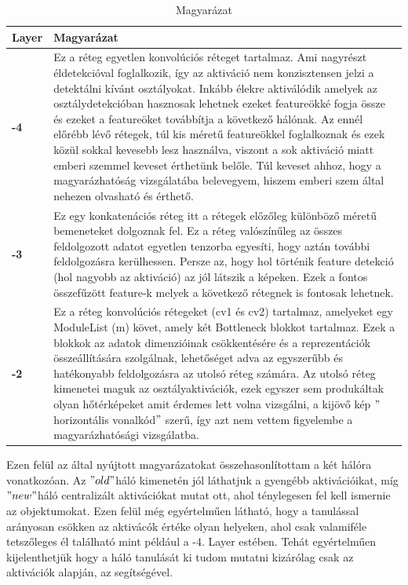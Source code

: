 \documentclass[12pt,oneside,a4paper]{article}
\theoremstyle{remark}
\newcommand{\oldh}{\( "old" \)}\label{makro2}
\newcommand{\newh}{\( "new" \)}
\begin{document}
	\begin{table}[ht]
		\center
		\begin{tabularx}{\textwidth}{|p{}||X|}
			\hline
			\textbf{Layer} & Magyarázat     \\
			\hline
			\textbf{-4}    & Ez a réteg egyetlen konvolúciós réteget tartalmaz.
			Ami nagyrészt éldetekcióval foglalkozik, így az aktiváció nem konzisztensen jelzi a detektálni kívánt osztályokat.
			Inkább élekre aktiválódik amelyek az osztálydetekcióban hasznosak lehetnek ezeket \gls{feature}ökké fogja
			össze és ezeket a \gls{feature}öket továbbítja a következő hálónak.
			Az ennél előrébb lévő rétegek, túl kis méretű \gls{feature}ökkel foglalkoznak és ezek közül sokkal kevesebb lesz használva,
			viszont a sok aktiváció miatt emberi szemmel keveset érthetünk belőle.
			Túl keveset ahhoz, hogy a magyarázhatóság vizsgálatába belevegyem, hiszem emberi szem által nehezen olvasható és érthető.\\
			\hline
			\textbf{-3}    & Ez egy konkatenációs réteg itt a rétegek előzőleg különböző méretű bemeneteket dolgoznak fel.
			Ez a réteg valószínűleg az összes feldolgozott adatot egyetlen tenzorba egyesíti, hogy aztán további
			feldolgozásra kerülhessen.
			Persze az, hogy hol történik \gls{feature} detekció (hol nagyobb az aktiváció) az jól látszik a képeken.
			Ezek a fontos összefűzött \gls{feature}-k
			melyek a következő rétegnek is fontosak lehetnek.\\
			\hline
			\textbf{-2}    &  Ez a réteg konvolúciós rétegeket (cv1 és cv2) tartalmaz, amelyeket egy ModuleList (m) követ,
			amely két Bottleneck blokkot tartalmaz.
			Ezek a blokkok az adatok dimenzióinak csökkentésére és a reprezentációk összeállítására szolgálnak,
			lehetőséget adva az egyszerűbb és hatékonyabb feldolgozásra az utolsó réteg számára.
			Az utolsó réteg kimenetei maguk az osztályaktivációk, ezek egyszer sem produkáltak olyan hőtérképeket amit
			érdemes lett volna vizsgálni, a kijövő kép \("\)horizontális vonalkód\("\) szerű, így azt nem vettem figyelembe a
			magyarázhatósági vizsgálatba.\\
			\hline
		\end{tabularx}
		\caption{Magyarázat}\label{tab:debrief}
	\end{table}
	Ezen felül az  által nyújtott magyarázatokat összehasonlítottam a két hálóra vonatkozóan.
	Az \oldh háló kimenetén jól láthatjuk a gyengébb aktivációikat, míg \newh háló centralizált aktivációkat mutat ott, ahol
	ténylegesen fel kell ismernie az objektumokat.
	Ezen felül még egyértelműen látható, hogy a tanulással arányosan csökken az aktivácók értéke olyan helyeken, ahol csak valamiféle
	tetszőleges él található mint például a -4. Layer estében.
	Tehát egyértelműen kijelenthetjük hogy a háló tanulását ki tudom mutatni kizárólag csak az aktivációk alapján, az
	 segítségével.
	
\end{document}

